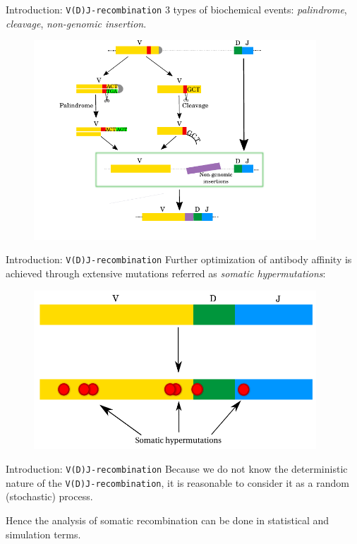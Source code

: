 \documentclass{beamer}\usepackage[]{graphicx}\usepackage[]{color}
\begin{document}
\begin{frame}{Introduction: \texttt{V(D)J-recombination}}
  3 types of biochemical events: \textit{palindrome}, \textit{cleavage}, \textit{non-genomic insertion}. 
  \begin{figure}[h]
    \center\includegraphics[width=300pt]{Pictures/vdj3_DJ_aligned_new.pdf}
 \end{figure}
\end{frame}

\begin{frame}{Introduction: \texttt{V(D)J-recombination}}
  Further optimization of antibody affinity is achieved through extensive mutations referred as \textit{somatic hypermutations}:
  \begin{figure}[h]
    \center\includegraphics[width=300pt]{Pictures/somatic_mutations.pdf}
 \end{figure}
\end{frame}

\begin{frame}{Introduction: \texttt{V(D)J-recombination}}
  Because we do not know the deterministic nature of the \texttt{V(D)J-recombination}, it is reasonable
  to consider it as a {\color{blue} random} (stochastic) process.

  \bigskip
  Hence the analysis of somatic recombination can be done in statistical and simulation terms. 
\end{frame}
\end{document}
